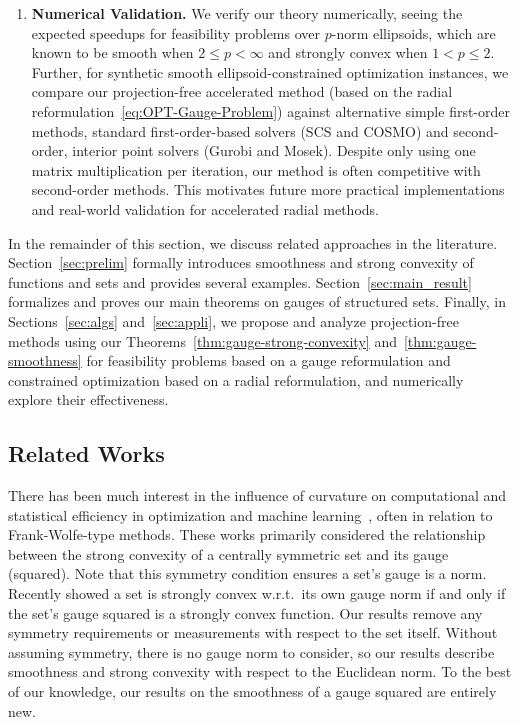 \documentclass[sn-mathphys,Numbered]{sn-jnl}%
\begin{document}
\begin{enumerate}
    \item {\bf Numerical Validation.} We verify our theory numerically, seeing the expected speedups for feasibility problems over $p$-norm ellipsoids, which are known to be smooth when $2\leq p < \infty$ and strongly convex when $1<p\leq 2$. Further, for synthetic smooth ellipsoid-constrained optimization instances, we compare our projection-free accelerated method (based on the radial reformulation~\eqref{eq:OPT-Gauge-Problem}) against alternative simple first-order methods, standard first-order-based solvers (SCS and COSMO) and second-order, interior point solvers (Gurobi and Mosek). Despite only using one matrix multiplication per iteration, our method is often competitive with second-order methods. This motivates future more practical implementations and real-world validation for accelerated radial methods.
\end{enumerate}

 In the remainder of this section, we discuss related approaches in the literature. Section~\ref{sec:prelim} formally introduces smoothness and strong convexity of functions and sets and provides several examples. Section~\ref{sec:main_result} formalizes and proves our main theorems on gauges of structured sets. Finally, in Sections~\ref{sec:algs} and~\ref{sec:appli}, we propose and analyze projection-free methods using our Theorems~\ref{thm:gauge-strong-convexity} and~\ref{thm:gauge-smoothness} for feasibility problems based on a gauge reformulation and constrained optimization based on a radial reformulation, and numerically explore their effectiveness.

\subsection{Related Works}\label{subsec:relate_work}

There has been much interest in the influence of curvature on computational and statistical efficiency in optimization and machine learning~\cite{garber2015faster, abernethy2018faster, demianov1970approximate, levitin1966constrained, dunn1979rates}, often in relation to Frank-Wolfe-type methods. These works primarily considered the relationship between the strong convexity of a centrally symmetric set and its gauge (squared). Note that this symmetry condition ensures a set's gauge is a norm. Recently \cite{molinaro2020curvature} showed a set is strongly convex w.r.t.~its own gauge norm if and only if the set's gauge squared is a strongly convex function. Our results remove any symmetry requirements or measurements with respect to the set itself. Without assuming symmetry, there is no gauge norm to consider, so our results describe smoothness and strong convexity with respect to the Euclidean norm. To the best of our knowledge, our results on the smoothness of a gauge squared are entirely new.
\end{document}
